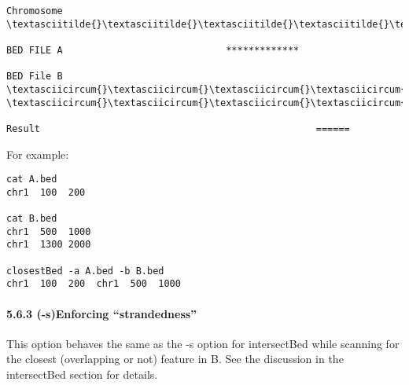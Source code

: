 \documentclass[letterpaper,10pt,english]{sphinxmanual}
\begin{document}
\begin{Verbatim}[commandchars=\\\{\}]
Chromosome  \textasciitilde{}\textasciitilde{}\textasciitilde{}\textasciitilde{}\textasciitilde{}\textasciitilde{}\textasciitilde{}\textasciitilde{}\textasciitilde{}\textasciitilde{}\textasciitilde{}\textasciitilde{}\textasciitilde{}\textasciitilde{}\textasciitilde{}\textasciitilde{}\textasciitilde{}\textasciitilde{}\textasciitilde{}\textasciitilde{}\textasciitilde{}\textasciitilde{}\textasciitilde{}\textasciitilde{}\textasciitilde{}\textasciitilde{}\textasciitilde{}\textasciitilde{}\textasciitilde{}\textasciitilde{}\textasciitilde{}\textasciitilde{}\textasciitilde{}\textasciitilde{}\textasciitilde{}\textasciitilde{}\textasciitilde{}\textasciitilde{}\textasciitilde{}\textasciitilde{}\textasciitilde{}\textasciitilde{}\textasciitilde{}\textasciitilde{}\textasciitilde{}\textasciitilde{}\textasciitilde{}\textasciitilde{}\textasciitilde{}\textasciitilde{}\textasciitilde{}\textasciitilde{}\textasciitilde{}\textasciitilde{}\textasciitilde{}\textasciitilde{}\textasciitilde{}\textasciitilde{}\textasciitilde{}\textasciitilde{}\textasciitilde{}\textasciitilde{}\textasciitilde{}\textasciitilde{}

BED FILE A                             *************

BED File B         \textasciicircum{}\textasciicircum{}\textasciicircum{}\textasciicircum{}\textasciicircum{}\textasciicircum{}\textasciicircum{}\textasciicircum{}                            \textasciicircum{}\textasciicircum{}\textasciicircum{}\textasciicircum{}\textasciicircum{}\textasciicircum{}

Result                                                 ======
\end{Verbatim}

For example:

\begin{Verbatim}[commandchars=\\\{\}]
cat A.bed
chr1  100  200

cat B.bed
chr1  500  1000
chr1  1300 2000

closestBed -a A.bed -b B.bed
chr1  100  200  chr1  500  1000
\end{Verbatim}


\paragraph{5.6.3 (-s)Enforcing ``strandedness''}
\label{content/closestBed:s-enforcing-strandedness}
This option behaves the same as the -s option for intersectBed while scanning for the closest
(overlapping or not) feature in B. See the discussion in the intersectBed section for details.
\end{document}
